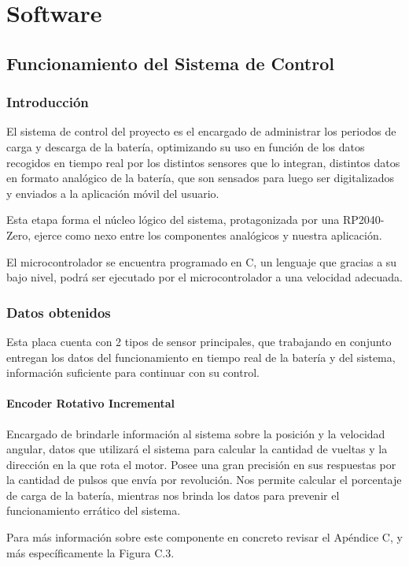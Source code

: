 \chapter{Software}

    \section{Funcionamiento del Sistema de Control}
    
        \subsection{Introducción}
        
            El sistema de control del proyecto es el encargado de administrar los periodos de carga y descarga de la batería, optimizando su uso en función de los datos recogidos en tiempo real por los distintos sensores que lo integran, distintos datos en formato analógico de la batería, que son sensados para luego ser digitalizados y enviados a la aplicación móvil del usuario.\par
            Esta etapa forma el núcleo lógico del sistema, protagonizada por una RP2040-Zero, ejerce como nexo entre los componentes analógicos y nuestra aplicación.\par
            El microcontrolador se encuentra programado en C, un lenguaje que gracias a su bajo nivel, podrá ser ejecutado por el microcontrolador a una velocidad adecuada.\par
            
        \subsection{Datos obtenidos}
        
            Esta placa cuenta con 2 tipos de sensor principales, que trabajando en conjunto entregan los datos del funcionamiento en tiempo real de la batería y del sistema, información suficiente para continuar con su control.\par
            
            \subsubsection{Encoder Rotativo Incremental}
            
                Encargado de brindarle información al sistema sobre la posición y la velocidad angular, datos que utilizará el sistema para calcular la cantidad de vueltas y la dirección en la que rota el motor. Posee una gran precisión en sus respuestas por la cantidad de pulsos que envía por revolución. Nos permite calcular el porcentaje de carga de la batería, mientras nos brinda los datos para prevenir el funcionamiento errático del sistema.\par
                Para más información sobre este componente en concreto revisar el Apéndice C, y más específicamente la Figura C.3.\par

